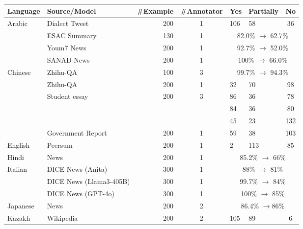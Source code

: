 \begin{table*}[t!]
    \centering
    \small
    \begin{tabular}{llr cll c}
    \toprule
    \textbf{Language} & \textbf{Source/Model} & \textbf{\#Example} & \textbf{\#Annotator} & \textbf{Yes} & \textbf{Partially} & \textbf{No}  \\
    \midrule
    \multirow{4}{*}{Arabic} 
    & Dialect Tweet & 200 & 1 & 106 & 58 & 36 \\
    & ESAC Summary & 130 & 1 & \multicolumn{3}{c}{82.0\% $\rightarrow$ 62.7\%} \\
    & Youm7 News & 200 & 1 & \multicolumn{3}{c}{92.7\% $\rightarrow$ 52.0\%} \\
    & SANAD News & 200 & 1 & \multicolumn{3}{c}{100\% $\rightarrow$ 66.0\%} \\
    \midrule
    \multirow{6}{*}{Chinese} 
    & Zhihu-QA & 100 & 3 & \multicolumn{3}{c}{99.7\% $\rightarrow$ 94.3\%} \\
    & Zhihu-QA & 200 & 1 & 32 & 70 & 98  \\
    & \multirow{3}{*}{Student essay}  & \multirow{3}{*}{200} & \multirow{3}{*}{3} 
    &  86 & 36 & 78 \\
    & & & & 84 & 36 & 80 \\
    & & & & 45 & 23 & 132 \\
    & Government Report & 200 & 1 & 59 & 38 & 103 \\
    \midrule
    English & Peersum & 200 & 1 & 2 & 113 & 85   \\
    \midrule
    Hindi & News & 200 & 1 & \multicolumn{3}{c}{85.2\% $\rightarrow$ 66\%}  \\
    \midrule
    \multirow{3}{*}{Italian} 
    & DICE News (Anita) & 300 & 1 & \multicolumn{3}{c}{88\% $\rightarrow$ 81\% } \\
    & DICE News (Llama3-405B) & 300 & 1 & \multicolumn{3}{c}{99.7\% $\rightarrow$ 84\% } \\
    & DICE News (GPT-4o) & 300 & 1 & \multicolumn{3}{c}{100\% $\rightarrow$ 85\%}  \\
    \midrule
    Japanese & News & 200 & 2 & \multicolumn{3}{c}{ 86.4\% $\rightarrow$86\% } \\
    \midrule
    Kazakh & Wikipedia & 200 & 2 & 105 & 89 & 6 \\

\end{tabular}
\end{table*}

